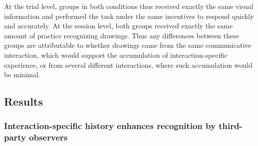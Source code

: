 \documentclass[10pt,letterpaper]{article}
\begin{document}
At the trial level, groups in both conditions thus received exactly the same visual information and performed the task under the same incentives to respond quickly and accurately.
At the session level, both groups received exactly the same amount of practice recognizing drawings.
Thus any differences between these groups are attributable to whether drawings came from the same communicative interaction, which would support the accumulation of interaction-specific experience, or from several different interactions, where such accumulation would be minimal.

\subsection{Results}

\subsubsection{Interaction-specific history enhances recognition by third-party observers}


\end{document}
